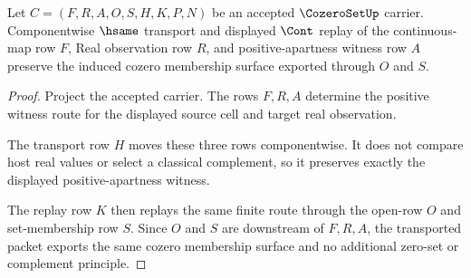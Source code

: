 \begin{theorem}
\label{thm:cozero-set-continuous-preimage-stability}
Let $C=(F,R,A,O,S,H,K,P,N)$ be an accepted $\CozeroSetUp$ carrier. Componentwise $\hsame$ transport and displayed $\Cont$ replay of the continuous-map row $F$, Real observation row $R$, and positive-apartness witness row $A$ preserve the induced cozero membership surface exported through $O$ and $S$.
\end{theorem}
\begin{proof}
Project the accepted carrier. The rows $F,R,A$ determine the positive witness route for the displayed source cell and target real observation.

The transport row $H$ moves these three rows componentwise. It does not compare host real values or select a classical complement, so it preserves exactly the displayed positive-apartness witness.

The replay row $K$ then replays the same finite route through the open-row $O$ and set-membership row $S$. Since $O$ and $S$ are downstream of $F,R,A$, the transported packet exports the same cozero membership surface and no additional zero-set or complement principle.
\end{proof}


\begin{closurestatus}{\CozeroSetUp}
  \theoryclosure{\seedClosure}
  \formalstatus{\unformalizedV}
\end{closurestatus}
